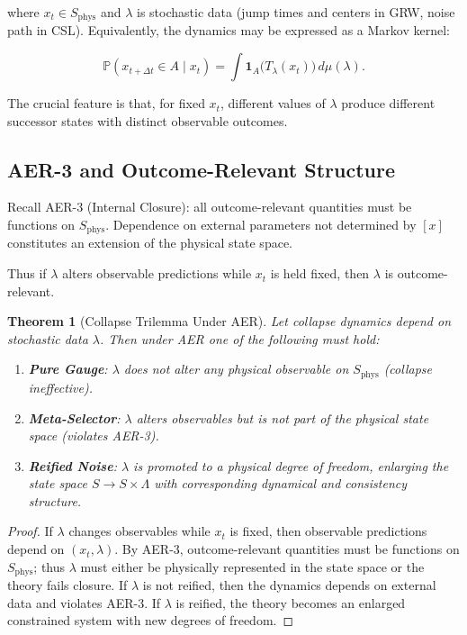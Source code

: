 \documentclass[11pt]{article}
\newtheorem{theorem}[definition]{Theorem}
\theoremstyle{remark}
\theoremstyle{plain}
\begin{document}
where $x_t \in S_{\mathrm{phys}}$ and $\lambda$ is stochastic data 
(jump times and centers in GRW, noise path in CSL). 
Equivalently, the dynamics may be expressed as a Markov kernel:

\begin{equation}
\mathbb{P}(x_{t+\Delta t} \in A \mid x_t) 
= \int \mathbf{1}_{A}\!\big(T_{\lambda}(x_t)\big)\, d\mu(\lambda).
\end{equation}

The crucial feature is that, for fixed $x_t$, different values of 
$\lambda$ produce different successor states with distinct observable outcomes.

\subsection{AER-3 and Outcome-Relevant Structure}

Recall AER-3 (Internal Closure): 
all outcome-relevant quantities must be functions on $S_{\mathrm{phys}}$.
Dependence on external parameters not determined by $[x]$ constitutes 
an extension of the physical state space.

Thus if $\lambda$ alters observable predictions while 
$x_t$ is held fixed, then $\lambda$ is outcome-relevant.

\begin{theorem}[Collapse Trilemma Under AER]
\label{thm:collapse-trilemma}
Let collapse dynamics depend on stochastic data $\lambda$.
Then under AER one of the following must hold:

\begin{enumerate}
\item \textbf{Pure Gauge}: $\lambda$ does not alter any physical observable 
on $S_{\mathrm{phys}}$ (collapse ineffective).
\item \textbf{Meta-Selector}: $\lambda$ alters observables but is not part of 
the physical state space (violates AER-3).
\item \textbf{Reified Noise}: $\lambda$ is promoted to a physical degree of freedom, 
enlarging the state space $S \rightarrow S \times \Lambda$ 
with corresponding dynamical and consistency structure.
\end{enumerate}
\end{theorem}

\begin{proof}
If $\lambda$ changes observables while $x_t$ is fixed, 
then observable predictions depend on $(x_t,\lambda)$. 
By AER-3, outcome-relevant quantities must be functions on 
$S_{\mathrm{phys}}$; thus $\lambda$ must either be physically represented 
in the state space or the theory fails closure. 
If $\lambda$ is not reified, then the dynamics depends on 
external data and violates AER-3. 
If $\lambda$ is reified, the theory becomes an enlarged 
constrained system with new degrees of freedom.
\end{proof}
\end{document}
